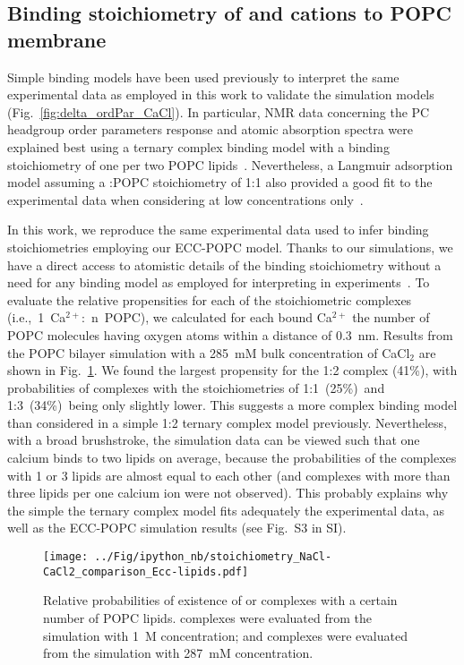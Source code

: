 \documentclass[journal=jpcbfk,manuscript=article]{achemso}
\begin{document}
\subsection{Binding stoichiometry of  and  cations to POPC membrane}
Simple binding models have been used previously to interpret the same experimental data \cite{altenbach84,macdonald87} as employed in this work to validate the simulation models (Fig.~\ref{fig:delta_ordPar_CaCl}). In particular, NMR data concerning the PC headgroup order parameters response and atomic absorption spectra were explained best using a ternary complex binding model with a binding stoichiometry of one  per two POPC lipids~\cite{altenbach84}. Nevertheless, a Langmuir adsorption model assuming a :POPC stoichiometry of 1:1 also provided a good fit to the experimental data when considering  at low concentrations only~\cite{macdonald87}.


In this work, we reproduce the same experimental data used to infer binding stoichiometries employing our ECC-POPC model. Thanks to our simulations, we have a direct access to atomistic details of the binding stoichiometry without a need for any binding model as employed for interpreting in experiments~\cite{altenbach84, macdonald87}.
To evaluate the relative propensities for each of the stoichiometric complexes (i.e.,~1~Ca$^{2+}$:~n~POPC),
we calculated for each bound Ca$^{2+}$ the number of POPC molecules having oxygen atoms within a distance of 0.3~nm.
Results from the POPC bilayer simulation with a 285~mM bulk concentration of CaCl$_2$ are shown in Fig.~\ref{fig:cacl_complexes}.
We found the largest propensity for the 1:2 complex (41\%), with probabilities of complexes with the stoichiometries of 1:1~(25\%)~and 1:3~(34\%)~being only slightly lower. This suggests a more complex binding model than considered in a simple 1:2 ternary complex model previously. Nevertheless, with a broad brushstroke, the simulation data can be viewed such that one calcium binds to two lipids on average, because the probabilities of the complexes with 1 or 3 lipids are almost equal to each other  (and complexes with more than three lipids per one calcium ion were not observed). This probably explains why the simple the ternary complex model fits adequately the experimental data, as well as the ECC-POPC simulation results (see Fig.~S3 in SI).

\begin{figure}[tb!]
  \centering
  \texttt{[image: ../Fig/ipython\_nb/stoichiometry\_NaCl-CaCl2\_comparison\_Ecc-lipids.pdf]} \\
  \caption{\label{fig:cacl_complexes}
      Relative probabilities of existence of  or  complexes
      with a certain number of POPC lipids. 
       complexes were evaluated from the simulation with 1~M concentration;
      and  complexes were evaluated from the simulation with 287~mM concentration.
  }
\end{figure}
\end{document}
